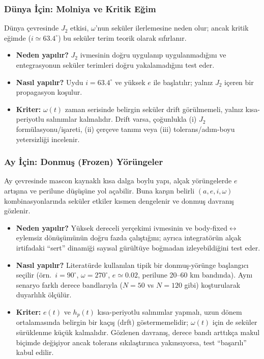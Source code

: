 \subsubsection{Dünya İçin: Molniya ve Kritik Eğim}
Dünya çevresinde $J_2$ etkisi, $\omega$'nun seküler ilerlemesine neden olur; ancak kritik eğimde
($i\simeq 63.4^\circ$) bu seküler terim teorik olarak sıfırlanır.
\begin{itemize}
\item \textbf{Neden yapılır?} $J_2$ ivmesinin doğru uygulanıp uygulanmadığını ve entegrasyonun seküler terimleri doğru
yakalamadığını test eder.
\item \textbf{Nasıl yapılır?} Uydu $i=63.4^\circ$ ve yüksek $e$ ile başlatılır; yalnız $J_2$ içeren bir propagasyon koşulur.
\item \textbf{Kriter:} $\omega(t)$ zaman serisinde belirgin seküler drift görülmemeli, yalnız kısa-periyotlu salınımlar kalmalıdır.
Drift varsa, çoğunlukla (i) $J_2$ formülasyonu/işareti, (ii) çerçeve tanımı veya (iii) tolerans/adım-boyu yetersizliği incelenir.
\end{itemize}

\subsubsection{Ay İçin: Donmuş (Frozen) Yörüngeler}
Ay çevresinde mascon kaynaklı kısa dalga boylu yapı, alçak yörüngelerde $e$ artışına ve perilune düşüşüne yol açabilir.
Buna karşın belirli $(a,e,i,\omega)$ kombinasyonlarında seküler etkiler kısmen dengelenir ve donmuş davranış gözlenir.
\begin{itemize}
\item \textbf{Neden yapılır?} Yüksek dereceli yerçekimi ivmesinin ve body-fixed$\leftrightarrow$eylemsiz dönüşümünün doğru fazda
çalıştığını; ayrıca integratörün alçak irtifadaki ``sert'' dinamiği sayısal gürültüye boğmadan izleyebildiğini test eder.
\item \textbf{Nasıl yapılır?} Literatürde kullanılan tipik bir donmuş-yörünge başlangıcı seçilir
(örn.\ $i=90^\circ$, $\omega=270^\circ$, $e\simeq 0.02$, perilune 20--60 km bandında). Aynı senaryo farklı derece bandlarıyla
($N=50$ vs $N=120$ gibi) koşturularak duyarlılık ölçülür.
\item \textbf{Kriter:} $e(t)$ ve $h_p(t)$ kısa-periyotlu salınımlar yapmalı, uzun dönem ortalamasında belirgin bir kaçış
(drft) göstermemelidir; $\omega(t)$ için de seküler sürüklenme küçük kalmalıdır. Gözlenen davranış, derece bandı arttıkça
makul biçimde değişiyor ancak tolerans sıkılaştırınca yakınsıyorsa, test ``başarılı'' kabul edilir.
\end{itemize}

